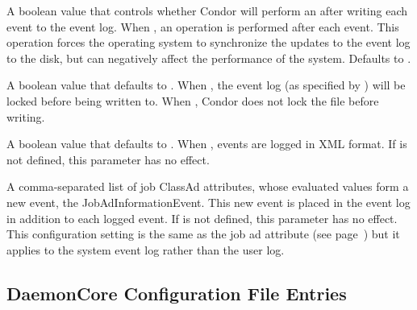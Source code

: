 \begin{description}
\label{param:EventLogFsync}
\item[\Macro{EVENT\_LOG\_FSYNC}]
  A boolean value that controls whether Condor will perform an
   after writing each event to the event log.
  When ,
  an  operation is performed after each event.
  This  operation forces the operating system to
  synchronize the updates to the event log to the disk, but can
  negatively affect the performance of the system.  
  Defaults to .

\label{param:EventLogLocking}
\item[\Macro{EVENT\_LOG\_LOCKING}]
  A boolean value that defaults to .
  When ,
  the event log (as specified by )
  will be locked before being written to.
  When , Condor does not lock the file before writing.

\label{param:EventLogUseXML}
\item[\Macro{EVENT\_LOG\_USE\_XML}]
  A boolean value that defaults to .
  When , events are logged in XML format.
  If  is not defined, this parameter has no effect.

\label{param:EventLogJobAdInformationAttrs}
\item[\Macro{EVENT\_LOG\_JOB\_AD\_INFORMATION\_ATTRS}]
  A comma-separated list of job ClassAd attributes,
  whose evaluated values form a new event, the JobAdInformationEvent.
  This new event is placed in the event log in addition to each logged event.
  If  is not defined, this parameter has no effect.
  This configuration setting is the same as the job ad attribute
   (see
  page~\pageref{JobAdInformationAttrs-job-attribute}) but it applies to
  the system event log rather than the user log.

\end{description}

\subsection{\label{sec:DaemonCore-Config-File-Entries}DaemonCore Configuration File Entries} 


